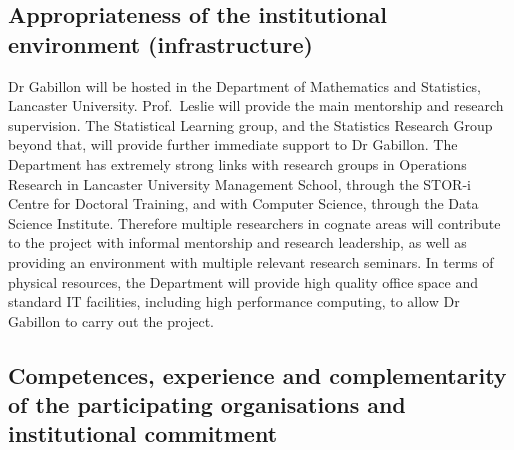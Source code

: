 \documentclass[a4paper,11pt]{article}
\begin{document}
\subsection{Appropriateness of the institutional environment (infrastructure)}
\label{sec:institution}


Dr Gabillon will be hosted in the Department of Mathematics and Statistics, Lancaster University.  Prof.\ Leslie will provide the main mentorship and research supervision.  The Statistical Learning group, and the Statistics Research Group beyond that, will provide further immediate support to Dr Gabillon.  The Department has extremely strong links with research groups in Operations Research in Lancaster University Management School, through the STOR-i Centre for Doctoral Training, and with Computer Science, through the Data Science Institute.  Therefore multiple researchers in cognate areas will contribute to the project with informal mentorship and research leadership, as well as providing an environment with multiple relevant research seminars.  In terms of physical resources, the Department will provide high quality office space and standard IT facilities, including high performance computing, to allow Dr Gabillon to carry out the project.


\subsection{Competences, experience and complementarity of the participating organisations and institutional commitment}
\label{sec:competences}


\end{document}
